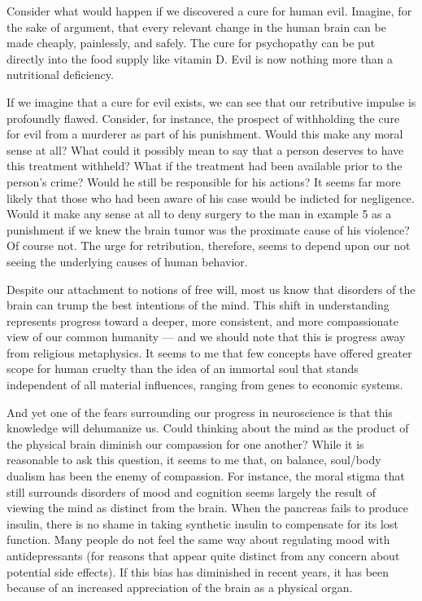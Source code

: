 \documentclass[a4paper,14pt]{extbook}
\begin{document}
Consider what would happen if we discovered a cure for human evil.
Imagine, for the sake of argument, that every relevant change in the human brain can be made cheaply, painlessly, and safely.
The cure for psychopathy can be put directly into the food supply like vitamin D.
Evil is now nothing more than a nutritional deficiency.

If we imagine that a cure for evil exists, we can see that our retributive impulse is profoundly flawed.
Consider, for instance, the prospect of withholding the cure for evil from a murderer as part of his punishment.
Would this make any moral sense at all?
What could it possibly mean to say that a person deserves to have this treatment withheld?
What if the treatment had been available prior to the person’s crime?
Would he still be responsible for his actions?
It seems far more likely that those who had been aware of his case would be indicted for negligence.
Would it make any sense at all to deny surgery to the man in example 5 as a punishment if we knew the brain tumor was the proximate cause of his violence?
Of course not.
The urge for retribution, therefore, seems to depend upon our not seeing the underlying causes of human behavior.

Despite our attachment to notions of free will, most us know that disorders of the brain can trump the best intentions of the mind.
This shift in understanding represents progress toward a deeper, more consistent, and more compassionate view of our common humanity --- and we should note that this is progress away from religious metaphysics.
It seems to me that few concepts have offered greater scope for human cruelty than the idea of an immortal soul that stands independent of all material influences, ranging from genes to economic systems.

And yet one of the fears surrounding our progress in neuroscience is that this knowledge will dehumanize us.
Could thinking about the mind as the product of the physical brain diminish our compassion for one another?
While it is reasonable to ask this question, it seems to me that, on balance, soul/body dualism has been the enemy of compassion.
For instance, the moral stigma that still surrounds disorders of mood and cognition seems largely the result of viewing the mind as distinct from the brain.
When the pancreas fails to produce insulin, there is no shame in taking synthetic insulin to compensate for its lost function.
Many people do not feel the same way about regulating mood with antidepressants (for reasons that appear quite distinct from any concern about potential side effects).
If this bias has diminished in recent years, it has been because of an increased appreciation of the brain as a physical organ.
\end{document}
